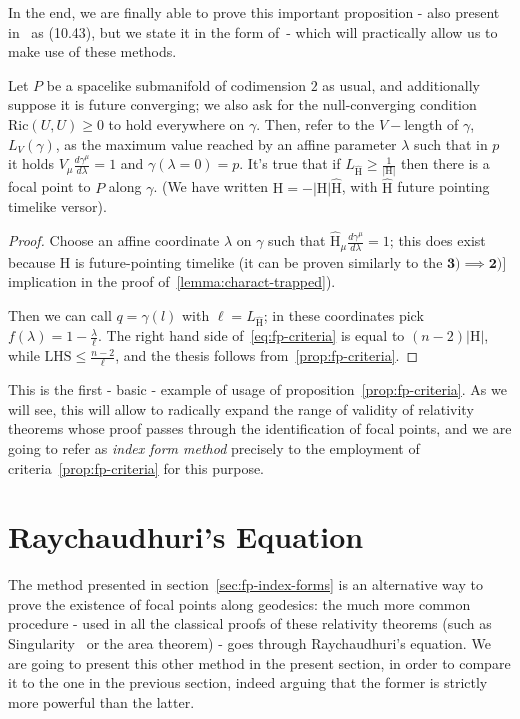 	In the end, we are finally able to prove this important proposition - also present in~\cite{o1983semi} as (10.43), but we state it in the form of~\cite{fewster2020new}- which will practically allow us to make use of these methods.
	\begin{corollary}
		\label{cor:fp-criteria}
		Let \(P\) be a spacelike submanifold of codimension \(2\) as usual, and additionally suppose it is future converging; we also ask for the null-converging condition \(\text{Ric}(U, U) \ge 0\) to hold everywhere on \(\gamma\). Then, refer to the \(V-\)length of \(\gamma\), \(L_V(\gamma)\), as the maximum value reached by an affine parameter \(\lambda\) such that in \(p\) it holds \(V_{\mu}\frac{d\gamma^{\mu}}{d\lambda} = 1\) and \(\gamma(\lambda = 0) = p\). It's true that if \(L_{\hat{\mathrm{H}}} \ge \frac{1}{|\mathrm{H}|}\) then there is a focal point to \(P\) along \(\gamma\). (We have written \(\mathrm{H} = - |\mathrm{H}|\hat{\mathrm{H}}\), with \(\hat{\mathrm{H}}\) future pointing timelike versor).
	\end{corollary}

	\begin{proof}
		Choose an affine coordinate \(\lambda\) on \(\gamma\) such that \(\hat{\mathrm{H}}_{\mu}\frac{d\gamma^{\mu}}{d\lambda} = 1\); this does exist because \(\mathrm{H}\) is future-pointing timelike (it can be proven similarly to the \(\mathbf{3) \implies 2)]}\) implication in the proof of~\ref{lemma:charact-trapped}).
		
		Then we can call \(q = \gamma(l)\) with \(\ell = L_{\hat{\mathrm{H}}}\); in these coordinates pick \(f(\lambda) = 1 - \frac{\lambda}{\ell}\). The right hand side of~\eqref{eq:fp-criteria} is equal to \((n-2)|\mathrm{H}|\), while \(\text{LHS} \le \frac{n - 2}{\ell}\), and the thesis follows from~\ref{prop:fp-criteria}.
	\end{proof}

	This is the first - basic - example of usage of proposition~\ref{prop:fp-criteria}. As we will see, this will allow to radically expand the range of validity of relativity theorems whose proof passes through the identification of focal points, and we are going to refer as \emph{index form method} precisely to the employment of criteria~\ref{prop:fp-criteria} for this purpose.
	
	\section{Raychaudhuri's Equation}
	The method presented in section~\ref{sec:fp-index-forms} is an alternative way to prove the existence of focal points along geodesics: the much more common procedure - used in all the classical proofs of these relativity theorems (such as Singularity~\cite{penrose1965gravitational} or the area theorem) - goes through Raychaudhuri's equation. We are going to present this other method in the present section, in order to compare it to the one in the previous section, indeed arguing that the former is strictly more powerful than the latter.
	
